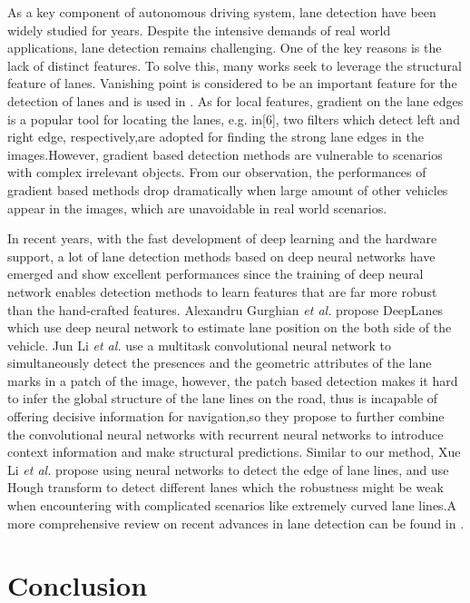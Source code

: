 \documentclass[10pt,twocolumn,letterpaper]{article}
\begin{document}
As a key component of autonomous driving system, lane detection have been widely studied for years.  Despite the intensive demands of real world applications, lane detection remains challenging.  One of the key reasons is the lack of distinct features. To solve this, many works seek to leverage the structural feature of lanes. Vanishing point is considered to be an important feature for the detection of lanes and is used in \cite{}.  As for local features, gradient on the lane edges is a popular tool for locating the lanes, e.g.  in[6], two filters which detect left and right edge, respectively,are adopted for finding the strong lane edges in the images.However, gradient based detection methods are vulnerable to scenarios with complex irrelevant objects.  From our observation, the performances of gradient based methods drop dramatically when large amount of other vehicles appear in the images, which are unavoidable in real world scenarios.

In recent years, with the fast development of deep learning and the hardware support, a lot of lane detection methods based on deep neural networks have emerged and show excellent  performances  since  the  training  of  deep  neural network enables detection methods to learn features that are far more robust than the hand-crafted features.  Alexandru Gurghian \textit{et al.} propose DeepLanes which use deep neural network to estimate lane position on the both side of the vehicle.   Jun Li \textit{et al.} use a multitask convolutional neural network to simultaneously detect the presences and the geometric attributes of the lane marks in a patch of the image,  however,  the  patch  based  detection  makes  it  hard  to infer the global structure of the lane lines on the road, thus is incapable of offering decisive information for navigation,so they propose to further combine the convolutional neural networks with recurrent neural networks to introduce context information and make structural predictions. Similar to our method,  Xue  Li \textit{et al.} propose  using  neural  networks to detect the edge of lane lines, and use Hough transform to detect different lanes which the robustness might be weak  when  encountering  with  complicated  scenarios  like extremely curved lane lines.A more comprehensive review on recent advances in lane detection can be found in \cite{}.

\section{Conclusion}
\end{document}

